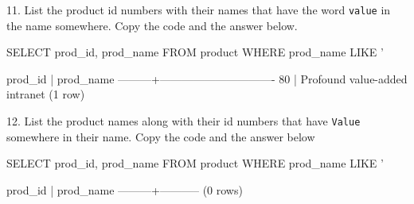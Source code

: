 11. List the product id numbers with their names that have the word \texttt{value} in the name somewhere. Copy the code and the answer below.
\begin{sql}
SELECT prod_id, prod_name FROM product
WHERE prod_name LIKE '%
\end{sql}
\begin{pseudo*}
 prod_id |           prod_name
---------+-------------------------------
      80 | Profound value-added intranet
(1 row)
\end{pseudo*}

12. List the product names along with their id numbers that have \texttt{Value} somewhere in their name. Copy the code and the answer below
\begin{sql}
SELECT prod_id, prod_name FROM product
WHERE prod_name LIKE '%
\end{sql}
\begin{pseudo*}
 prod_id | prod_name
---------+-----------
(0 rows)
\end{pseudo*}

